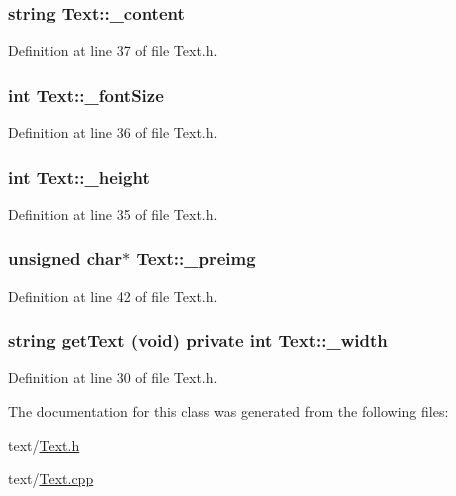 \hypertarget{class_text_a55efc4978055b131f1fe0e3b04f75808}{
\subsubsection[{\-\_\-content}]{\setlength{\rightskip}{0pt plus 5cm}string Text\-::\-\_\-content}}\label{class_text_a55efc4978055b131f1fe0e3b04f75808}


Definition at line 37 of file Text.\-h.

\hypertarget{class_text_a5a283a4a90cd545aaf166a3b021e5888}{
\subsubsection[{\-\_\-font\-Size}]{\setlength{\rightskip}{0pt plus 5cm}int Text\-::\-\_\-font\-Size}}\label{class_text_a5a283a4a90cd545aaf166a3b021e5888}


Definition at line 36 of file Text.\-h.

\hypertarget{class_text_aa4b29835f50543d0eb48973b441c7914}{
\subsubsection[{\-\_\-height}]{\setlength{\rightskip}{0pt plus 5cm}int Text\-::\-\_\-height}}\label{class_text_aa4b29835f50543d0eb48973b441c7914}


Definition at line 35 of file Text.\-h.

\hypertarget{class_text_a26d2fa0f8b96e1e64e9cd4d772969b03}{
\subsubsection[{\-\_\-preimg}]{\setlength{\rightskip}{0pt plus 5cm}unsigned char$\ast$ Text\-::\-\_\-preimg}}\label{class_text_a26d2fa0f8b96e1e64e9cd4d772969b03}


Definition at line 42 of file Text.\-h.

\hypertarget{class_text_a273978b9cc0d795ee4a19ca4c3aaa51c}{
\subsubsection[{\-\_\-width}]{\setlength{\rightskip}{0pt plus 5cm}string {\bf get\-Text} (void) private int Text\-::\-\_\-width}}\label{class_text_a273978b9cc0d795ee4a19ca4c3aaa51c}


Definition at line 30 of file Text.\-h.



The documentation for this class was generated from the following files\-:\begin{DoxyCompactItemize}
\item 
text/\hyperlink{_text_8h}{Text.\-h}\item 
text/\hyperlink{_text_8cpp}{Text.\-cpp}\end{DoxyCompactItemize}
